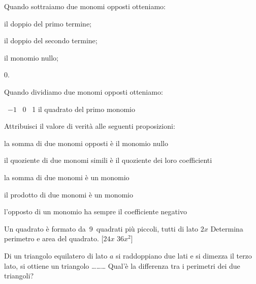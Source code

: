 \begin{esercizio}
 \label{ese:9.38}
Quando sottraiamo due monomi opposti otteniamo:
\begin{enumeratea}
\item il doppio del primo termine;
\item il doppio del secondo termine;
\item il monomio nullo;
\item 0.
\end{enumeratea}
\end{esercizio}

\begin{esercizio}
 \label{ese:9.39}
Quando dividiamo due monomi opposti otteniamo:
\begin{center}
\boxA\quad~\(-1\)
\quad\boxB\quad~0
\quad\boxC\quad~1
\quad\boxD\quad il quadrato del primo monomio
\end{center}
\end{esercizio}

\begin{esercizio}
 \label{ese:9.40}
Attribuisci il valore di verità alle seguenti proposizioni:
\TabPositions{11cm}
\begin{enumeratea}
 \item la somma di due monomi opposti è il monomio nullo \tab\boxV\quad\boxF
 \item il quoziente di due monomi simili è il quoziente dei loro coefficienti 
\tab\boxV\quad\boxF
 \item la somma di due monomi è un monomio \tab\boxV\quad\boxF
 \item il prodotto di due monomi è un monomio \tab\boxV\quad\boxF
 \item l'opposto di un monomio ha sempre il coefficiente negativo 
\tab\boxV\quad\boxF
\end{enumeratea}
\end{esercizio}

\begin{esercizio}[\Ast]
 \label{ese:9.41}
Un quadrato è formato da~9~quadrati più piccoli, tutti di lato \( 2x \) 
Determina perimetro e area del quadrato. \hfill[\(24x\) \( 36x^2 \)]
\end{esercizio}

\begin{esercizio}[\Ast]
 \label{ese:9.42}
Di un triangolo equilatero di lato \( a \) si raddoppiano due lati e 
si dimezza il terzo lato, si ottiene un triangolo \ldots\ldots\ldots 
Qual'è la differenza tra i perimetri dei due triangoli? 
\hfill{}
\end{esercizio}

